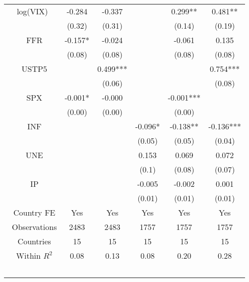 \begin{tiny}\begin{tabular}{cccccc}
\toprule
log(VIX)&-0.284&-0.337&& 0.299**& 0.481**\\\
 &(0.32)&(0.31)&&(0.14)&(0.19)\\\
FFR&-0.157*&-0.024&&-0.061& 0.135\\\
 &(0.08)&(0.08)&&(0.08)&(0.08)\\\
USTP5&& 0.499***&&& 0.754***\\\
 &&(0.06)&&&(0.08)\\\
SPX&-0.001*&-0.000&&-0.001***&\\\
 &(0.00)&(0.00)&&(0.00)&\\\
INF&&&-0.096*&-0.138**&-0.136***\\\
 &&&(0.05)&(0.05)&(0.04)\\\
UNE&&& 0.153& 0.069& 0.072\\\
 &&&(0.1)&(0.08)&(0.07)\\\
IP&&&-0.005&-0.002& 0.001\\\
 &&&(0.01)&(0.01)&(0.01)\\\
Country FE&Yes&Yes&Yes&Yes&Yes\\\
Observations&2483&2483&1757&1757&1757\\\
Countries&15&15&15&15&15\\\
Within $R^2$&0.08&0.13&0.08&0.20&0.28\\\
\end{tabular}
\end{tiny}